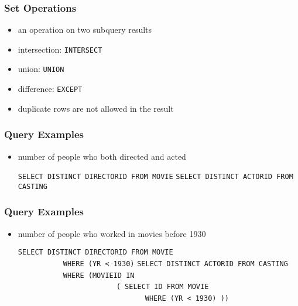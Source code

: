\documentclass[dvipsnames]{beamer}
\theoremstyle{plain}
\begin{document}
\begin{frame}
  \frametitle{Set Operations}

  \begin{itemize}
    \item an operation on two subquery results

    \medskip
    \item intersection: \lstinline!INTERSECT!
    \item union: \lstinline!UNION!
    \item difference: \lstinline!EXCEPT!

    \medskip
    \item duplicate rows are not allowed in the result
  \end{itemize}
\end{frame}

\begin{frame}[fragile]
  \frametitle{Query Examples}

  \begin{itemize}
  \item number of people who both directed and acted

  \medskip
{}
\lstinline!SELECT DISTINCT DIRECTORID FROM MOVIE!
\lstinline!SELECT DISTINCT ACTORID FROM CASTING!
  \end{itemize}
\end{frame}

\begin{frame}[fragile]
  \frametitle{Query Examples}

  \begin{itemize}
    \item number of people who worked in movies before 1930

    \medskip
{}
\lstinline!SELECT DISTINCT DIRECTORID FROM MOVIE!\\
~~~~~~~~~~~\lstinline!WHERE (YR < 1930)!
\lstinline!SELECT DISTINCT ACTORID FROM CASTING!\\
~~~~~~~~~~~\lstinline!WHERE (MOVIEID IN!\\
~~~~~~~~~~~~~~~~~~~~~~~~\lstinline!( SELECT ID FROM MOVIE!\\
~~~~~~~~~~~~~~~~~~~~~~~~~~~~~~~\lstinline!WHERE (YR < 1930) ))!
  \end{itemize}
\end{frame}
\end{document}
